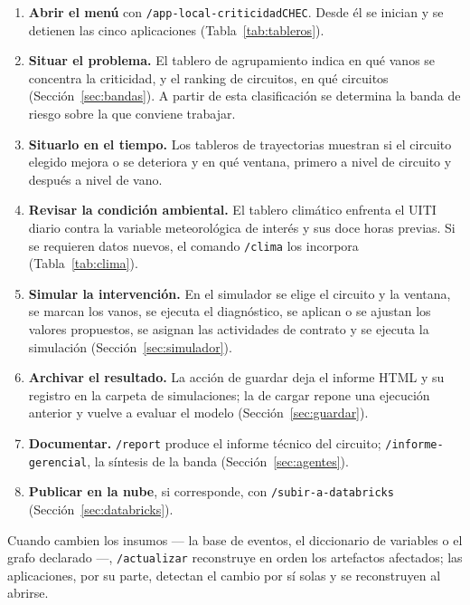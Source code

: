 \documentclass[11pt,a4paper]{article}
\begin{document}
\begin{enumerate}
  \item \textbf{Abrir el menú} con \texttt{/app-local-criticidadCHEC}. Desde él se inician y
        se detienen las cinco aplicaciones (Tabla~\ref{tab:tableros}).
  \item \textbf{Situar el problema.} El tablero de agrupamiento indica en qué vanos se
        concentra la criticidad, y el ranking de circuitos, en qué circuitos
        (Sección~\ref{sec:bandas}). A partir de esta clasificación se determina la banda
        de riesgo sobre la que conviene trabajar.
  \item \textbf{Situarlo en el tiempo.} Los tableros de trayectorias muestran si el circuito
        elegido mejora o se deteriora y en qué ventana, primero a nivel de circuito y después
        a nivel de vano.
  \item \textbf{Revisar la condición ambiental.} El tablero climático enfrenta el UITI diario
        contra la variable meteorológica de interés y sus doce horas previas. Si se requieren
        datos nuevos, el comando \texttt{/clima} los incorpora (Tabla~\ref{tab:clima}).
  \item \textbf{Simular la intervención.} En el simulador se elige el circuito y la ventana,
        se marcan los vanos, se ejecuta el diagnóstico, se aplican o se ajustan los valores
        propuestos, se asignan las actividades de contrato y se ejecuta la simulación
        (Sección~\ref{sec:simulador}).
  \item \textbf{Archivar el resultado.} La acción de guardar deja el informe HTML y su
        registro en la carpeta de simulaciones; la de cargar repone una ejecución anterior y
        vuelve a evaluar el modelo (Sección~\ref{sec:guardar}).
  \item \textbf{Documentar.} \texttt{/report} produce el informe técnico del circuito;
        \texttt{/informe-gerencial}, la síntesis de la banda (Sección~\ref{sec:agentes}).
  \item \textbf{Publicar en la nube}, si corresponde, con \texttt{/subir-a-databricks}
        (Sección~\ref{sec:databricks}).
\end{enumerate}

Cuando cambien los insumos --- la base de eventos, el diccionario de variables o el grafo
declarado ---, \texttt{/actualizar} reconstruye en orden los artefactos afectados; las
aplicaciones, por su parte, detectan el cambio por sí solas y se reconstruyen al abrirse.

\end{document}
